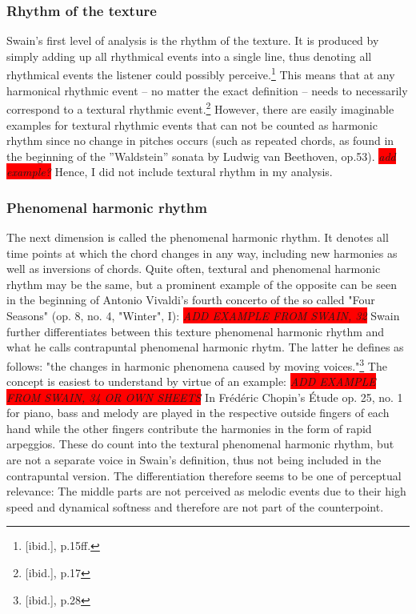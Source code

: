 \documentclass[a4paper,12pt]{report}
\begin{document}
\subsubsection{Rhythm of the texture}
Swain's first level of analysis is the rhythm of the texture. It is produced by simply adding up all rhythmical events into a single line, thus denoting all rhythmical events the listener could possibly perceive.\footnote{[ibid.], p.15ff.} This means that at any harmonical rhythmic event -- no matter the exact definition -- needs to necessarily correspond to a textural rhythmic event.\footnote{[ibid.], p.17} However, there are easily imaginable examples for textural rhythmic events that can not be counted as harmonic rhythm since no change in pitches occurs (such as repeated chords, as found in the beginning of the ''Waldstein'' sonata by Ludwig van Beethoven, op.53). \emph{\colorbox{red}{add example?}} Hence, I did not include textural rhythm in my analysis.

\subsubsection{Phenomenal harmonic rhythm}
The next dimension is called the phenomenal harmonic rhythm. It denotes all time points at which the chord changes in any way, including new harmonies as well as inversions of chords. Quite often, textural and phenomenal harmonic rhythm may be the same, but a prominent example of the opposite can be seen in the beginning of Antonio Vivaldi's fourth concerto of the so called "Four Seasons" (op. 8, no. 4, "Winter", I): \emph{\colorbox{red}{ADD EXAMPLE FROM SWAIN, 32}}
Swain further differentiates between this texture phenomenal harmonic rhythm and what he calls contrapuntal phenomenal harmonic rhytm. The latter he defines as follows: "the changes in harmonic phenomena caused by moving voices."\footnote{[ibid.], p.28} The concept is easiest to understand by virtue of an example: \emph{\colorbox{red}{ADD EXAMPLE FROM SWAIN, 34 OR OWN SHEETS}} In Fr\'{e}d\'{e}ric Chopin's \'{E}tude op. 25, no. 1 for piano, bass and melody are played in the respective outside fingers of each hand while the other fingers contribute the harmonies in the form of rapid arpeggios. These do count into the textural phenomenal harmonic rhythm, but are not a separate voice in Swain's definition, thus not being included in the contrapuntal version. The differentiation therefore seems to be one of perceptual relevance: The middle parts are not perceived as melodic events due to their high speed and dynamical softness and therefore are not part of the counterpoint.
\end{document}
